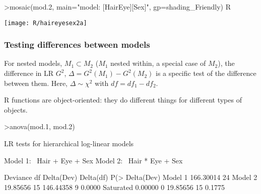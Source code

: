 \begin{frame}[fragile]
\begin{Rin}
>mosaic(mod.2,  main="model: [HairEye][Sex]", gp=shading_Friendly)
R\end{Rin}
 \begin{center}
 \texttt{[image: R/haireyesex2a]}
 \end{center}

\end{frame}
\begin{frame}[fragile]
\frametitle{Testing differences between models}
\begin{itemize*}
  \item For \alert{nested models}, $M_1 \subset M_2$ ($M_1$ nested within, a special
  case of $M_2$), 
  the difference in LR $G^2$,
  $\Delta = G^2 (M_1) - G^2 (M_2)$
  is a \alert{specific test of the difference} between
  them.  Here, $\Delta \sim \chi^2$ with $df = df_1 - df_2$.
  \item R functions are object-oriented: they do different things for
  different types of objects.
\end{itemize*}

\begin{Rin}
>anova(mod.1, mod.2)
\end{Rin}
\begin{Rout}
LR tests for hierarchical log-linear models

Model 1:
 ~Hair + Eye + Sex 
Model 2:
 ~Hair * Eye + Sex 

           Deviance df Delta(Dev) Delta(df) P(> Delta(Dev)
Model 1   166.30014 24                                    
Model 2    19.85656 15  146.44358         9         0.0000
Saturated   0.00000  0   19.85656        15         0.1775
\end{Rout}

\end{frame}
